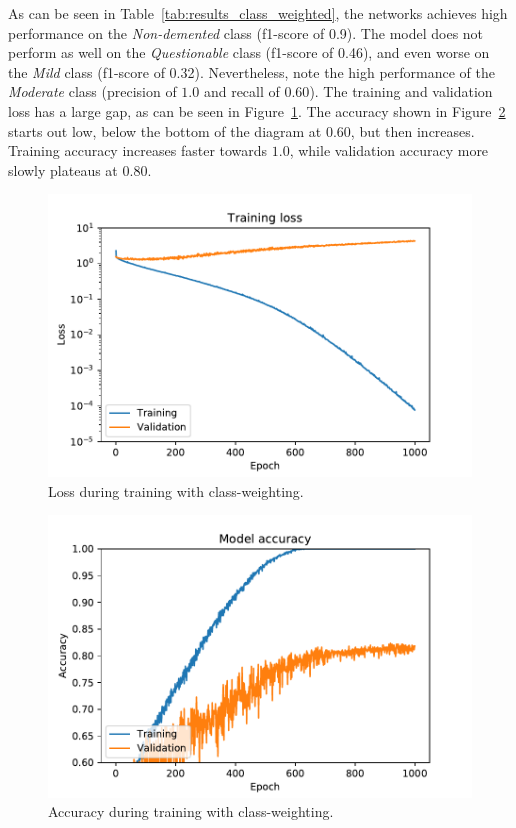 \documentclass{kththesis}
\begin{document}
As can be seen in Table~\ref{tab:results_class_weighted}, the networks achieves high performance on the \textit{Non-demented} class (f1-score of 0.9). The model does not perform as well on the \textit{Questionable} class (f1-score of 0.46), and even worse on the \textit{Mild} class (f1-score of 0.32). Nevertheless, note the high performance of the \textit{Moderate} class (precision of $1.0$ and recall of $0.60$). The training and validation loss has a large gap, as can be seen in Figure~\ref{fig:loss_class_weighting}. The accuracy shown in Figure~\ref{fig:accuracy_class_weighting} starts out low, below the bottom of the diagram at $0.60$, but then increases. Training accuracy increases faster towards $1.0$, while validation accuracy more slowly plateaus at $0.80$.

\begin{figure}[H]
  \centering
  \includegraphics[width=0.9\linewidth]{img/loss_class_weighted.pdf}
  \caption{Loss during training with class-weighting.} \label{fig:loss_class_weighting}
  \vspace{-30mm}
\end{figure}
\begin{figure}[H]
  \centering
  \includegraphics[width=0.9\linewidth]{img/accuracy_class_weighted.pdf}
  \caption{Accuracy during training with class-weighting.} \label{fig:accuracy_class_weighting}
\end{figure}
\end{document}
